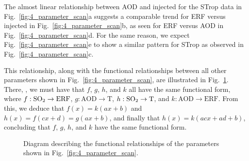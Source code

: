 \documentclass[draft]{agujournal2019}
\begin{document}
  The almost linear relationship between AOD and injected  for the STrop data in
  Fig.~\ref{fig:4_parameter_scan}a suggests a comparable trend for ERF versus injected
   in Fig.~\ref{fig:4_parameter_scan}b, as seen for ERF versus AOD in
  Fig.~\ref{fig:4_parameter_scan}d. For the same reason, we expect
  Fig.~\ref{fig:4_parameter_scan}e to show a similar pattern for STrop as observed in
  Fig.~\ref{fig:4_parameter_scan}c.

  This relationship, along with the functional relationships between all other
  parameters shown in Fig.~\ref{fig:4_parameter_scan}, are illustrated in
  Fig.~\ref{fig:5_diagram_of_function_relations}. There, 
  , we must have that \(f\), \(g\), \(h\), and \(k\) all have the same
  functional form, where \(f: \ce{SO2} \to \mathrm{ERF}\), \(g: \mathrm{AOD} \to
  \mathrm{T}\), \(h: \ce{SO2} \to \mathrm{T}\), and \(k: \mathrm{AOD} \to
  \mathrm{ERF}\). From this, we deduce that \(f(x)=k(ax+b)\) and
  \(h(x)=f(cx+d)=g(ax+b)\), and finally that \(h(x)=k(acx+ad+b)\), concluding that
  \(f\), \(g\), \(h\), and \(k\) have the same functional form.

  \begin{figure}
    \centering


    \caption{Diagram describing the functional relationships of the parameters shown in
      Fig.~\ref{fig:4_parameter_scan}.}\label{fig:5_diagram_of_function_relations}%
  \end{figure}
\end{document}
